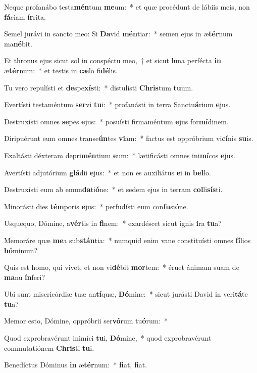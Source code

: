 \item Neque profanábo testa\textbf{mén}tum \textbf{me}um:~* et quæ procédunt de lábiis meis, non \textbf{fá}ciam \textbf{ír}rita.
\item Semel jurávi in sancto meo: Si \textbf{Da}vid \textbf{mén}tiar:~* semen ejus in æ\textbf{tér}num ma\textbf{né}bit.
\item Et thronus ejus sicut sol in conspéctu meo,~† et sicut luna perfécta \textbf{in} æ\textbf{tér}num:~* et testis in \textbf{cæ}lo fi\textbf{dé}lis.
\item Tu vero repulísti et \textbf{de}spe\textbf{xís}ti:~* distulísti \textbf{Chris}tum \textbf{tu}um.
\item Evertísti testaméntum \textbf{ser}vi \textbf{tu}i:~* profanásti in terra Sanctu\textbf{á}rium \textbf{e}jus.
\item Destruxísti omnes \textbf{se}pes \textbf{e}jus:~* posuísti firmaméntum \textbf{e}jus for\textbf{mí}dinem.
\item Diripuérunt eum omnes transe\textbf{ún}tes \textbf{vi}am:~* factus est oppróbrium vi\textbf{cí}nis \textbf{su}is.
\item Exaltásti déxteram depri\textbf{mén}tium \textbf{e}um:~* lætificásti omnes ini\textbf{mí}cos \textbf{e}jus.
\item Avertísti adjutórium \textbf{glá}dii \textbf{e}jus:~* et non es auxiliátus \textbf{e}i in \textbf{bel}lo.
\item Destruxísti eum ab emun\textbf{da}ti\textbf{ó}ne:~* et sedem ejus in terram \textbf{col}li\textbf{sís}ti.
\item Minorásti dies \textbf{tém}poris \textbf{e}jus:~* perfudísti eum con\textbf{fu}si\textbf{ó}ne.
\item Usquequo, Dómine, a\textbf{vér}tis in \textbf{fi}nem:~* exardéscet sicut ignis \textbf{i}ra \textbf{tu}a?
\item Memoráre quæ \textbf{me}a sub\textbf{stán}tia:~* numquid enim vane constituísti omnes \textbf{fí}lios \textbf{hó}minum?
\item Quis est homo, qui vivet, et non vi\textbf{dé}bit \textbf{mor}tem:~* éruet ánimam suam de \textbf{ma}nu \textbf{ín}feri?
\item Ubi sunt misericórdiæ tuæ an\textbf{tí}quæ, \textbf{Dó}mine:~* sicut jurásti David in veri\textbf{tá}te \textbf{tu}a?
\item Memor esto, Dómine, oppróbrii ser\textbf{vó}rum tu\textbf{ó}rum:~* 
\item Quod exprobravérunt inimíci \textbf{tu}i, \textbf{Dó}mine,~* quod exprobravérunt commutatiónem \textbf{Chris}ti \textbf{tu}i.
\item Benedíctus Dóminus \textbf{in} æ\textbf{tér}num:~* \textbf{fi}at, \textbf{fi}at.
